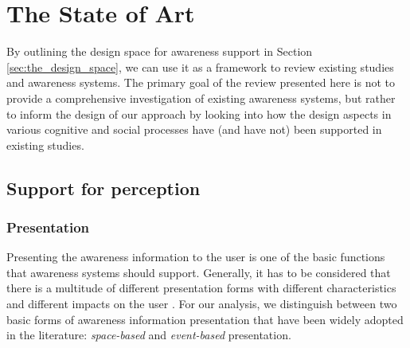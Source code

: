 
\section{The State of Art} %
\label{sec:the_state_of_art}
By outlining the design space for awareness support in Section \ref{sec:the_design_space}, we can use it as a framework to review existing studies and awareness systems. The primary goal of the review presented here is not to provide a comprehensive investigation of existing awareness systems, but rather to inform the design of our approach by looking into how the design aspects in various cognitive and social processes have (and have not) been supported in existing studies.

\subsection{Support for perception} %
\label{sub:support_for_perception}
\subsubsection*{Presentation} %
\label{ssub:presentation}
Presenting the awareness information to the user is one of the basic functions that awareness systems should support. Generally, it has to be considered that there is a multitude of different presentation forms with different characteristics and different impacts on the user \cite{Berlage1999}. For our analysis, we distinguish between two basic forms of awareness information presentation that have been widely adopted in the literature: \emph{space-based} and \emph{event-based} presentation. 

